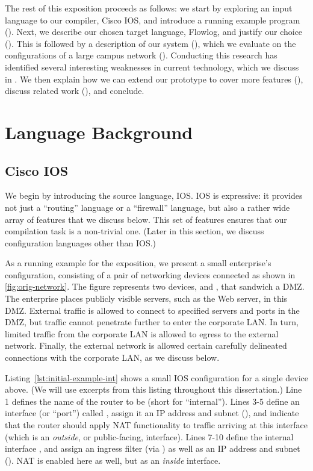 The rest of this exposition proceeds as follows: we start by exploring an
input language to our compiler, Cisco IOS, and introduce a running
example program ().  Next, we describe our chosen
target language, Flowlog, and justify our choice
(). This is followed by a description
of our system (), which we
evaluate on the configurations of a large campus network
().  Conducting this research has identified
several interesting weaknesses in current technology, which we discuss
in . We then explain how we can extend our
prototype to cover more features (), discuss
related work (), and conclude.

\chapter{Language Background}
\section{Cisco IOS}
\label{s:bg:ios}

We begin by introducing the source language, IOS. IOS is expressive:
it provides not just a ``routing'' language or a ``firewall'' language, but
also a rather wide array of features that we discuss
below. This set of features ensures that our compilation
task is a non-trivial one. (Later in this section, 
we discuss configuration languages other than IOS.)

As a running example for the exposition, we present a small enterprise's
configuration, consisting of a pair of networking devices connected as
shown in \autoref{fig:orig-network}. The figure represents two
devices,  and , that sandwich a DMZ. The enterprise
places publicly visible servers, such as the Web server, in this
DMZ. External traffic is allowed to connect to specified servers and
ports in the DMZ, but traffic cannot penetrate further to enter the
corporate LAN. In turn, limited traffic from the corporate LAN is
allowed to egress to the external network. Finally, the external
network is allowed certain carefully delineated
connections with the corporate LAN, as we discuss below.

Listing~\ref{lst:initial-example-int} shows a small IOS configuration for a single
device above. (We will use excerpts from this listing throughout this dissertation.)
Line 1 defines the name of the router to be  (short for
``internal''). Lines 3-5 define an interface (or ``port'') called ,
assign it an IP address and subnet (), and indicate
that the router should apply NAT functionality to traffic arriving at this interface
(which is an \emph{outside}, or public-facing, interface). Lines 7-10 define the internal
interface , and assign an ingress filter (via ) as
well as an IP address and subnet (). NAT is enabled here
as well, but as an \emph{inside} interface.

